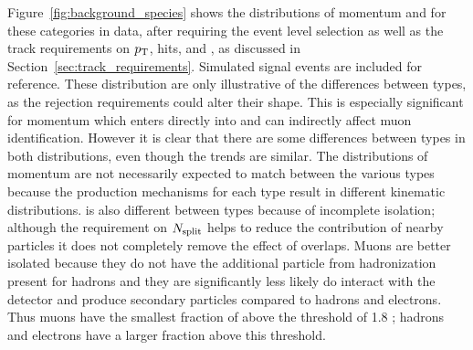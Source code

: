 Figure~\ref{fig:background_species} shows the distributions of momentum and \dedx for these categories in data, after requiring the event level selection as well as the track requirements on $p_{\mathrm{T}}$, hits, and \Nsplit, as discussed in Section~\ref{sec:track_requirements}.
Simulated signal events are included for reference.
These distribution are only illustrative of the differences between types, as the rejection requirements could alter their shape. 
This is especially significant for momentum which enters directly into \ep and can indirectly affect muon identification.
However it is clear that there are some differences between types in both distributions, even though the trends are similar.
The distributions of momentum are not necessarily expected to match between the various types because the production mechanisms for each type result in different kinematic distributions.
\dedx is also different between types because of incomplete isolation; although the requirement on $N_{\mathrm{split}}$ helps to reduce the contribution of nearby particles it does not completely remove the effect of overlaps.
Muons are better isolated because they do not have the additional particle from hadronization present for hadrons and they are significantly less likely do interact with the detector and produce secondary particles compared to hadrons and electrons.
Thus muons have the smallest fraction of \dedx above the threshold of 1.8 \MeVgcm; hadrons and electrons have a larger fraction above this threshold.

